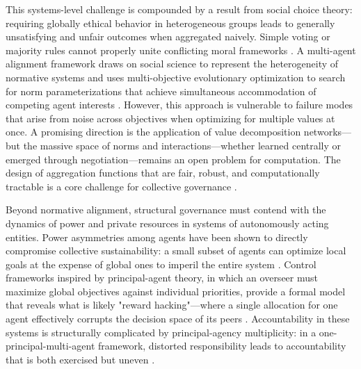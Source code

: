 \documentclass[11pt,a4paper]{article}
\begin{document}
This systems-level challenge is compounded by a result from social choice theory: requiring globally ethical behavior in heterogeneous groups leads to generally unsatisfying and unfair outcomes when aggregated naively. Simple voting or majority rules cannot properly unite conflicting moral frameworks \cite{arxiv:2505.23847v5}. A multi-agent alignment framework draws on social science to represent the heterogeneity of normative systems and uses multi-objective evolutionary optimization to search for norm parameterizations that achieve simultaneous accommodation of competing agent interests \cite{arxiv:2503.09648v1}. However, this approach is vulnerable to failure modes that arise from noise across objectives when optimizing for multiple values at once. A promising direction is the application of value decomposition networks---but the massive space of norms and interactions---whether learned centrally or emerged through negotiation---remains an open problem for computation. The design of aggregation functions that are fair, robust, and computationally tractable is a core challenge for collective governance \cite{arxiv:2411.14033v2}.

Beyond normative alignment, structural governance must contend with the dynamics of power and private resources in systems of autonomously acting entities. Power asymmetries among agents have been shown to directly compromise collective sustainability: a small subset of agents can optimize local goals at the expense of global ones to imperil the entire system \cite{arxiv:2412.05449v1}. Control frameworks inspired by principal-agent theory, in which an overseer must maximize global objectives against individual priorities, provide a formal model that reveals what is likely "reward hacking"---where a single allocation for one agent effectively corrupts the decision space of its peers \cite{arxiv:2603.08852v1}. Accountability in these systems is structurally complicated by principal-agency multiplicity: in a one-principal-multi-agent framework, distorted responsibility leads to accountability that is both exercised but uneven \cite{arxiv:2502.08586v1}.
\end{document}
